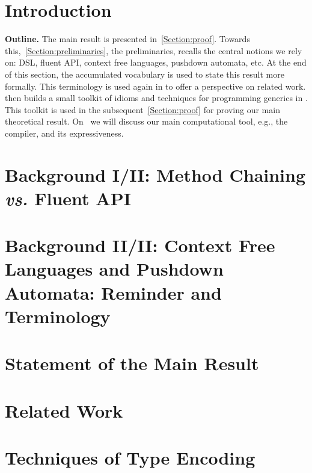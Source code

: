 \documentclass[a4paper,USenglish]{lipics}
\author{Anonymized for the submission}
\begin{document}
\maketitle
\begin{abstract}
  
\end{abstract}

\section{Introduction}


\textbf{Outline.}
The main result is presented in~\cref{Section:proof}.
Towards this,~\cref{Section:preliminaries}, the preliminaries, 
  recalls the central notions we rely on: DSL, fluent API,
  context free languages, pushdown automata, etc. 
At the end of this section, the accumulated vocabulary is used to state this
  result more formally.
This terminology is used again in  to offer 
  a perspective on related work.
 then builds a small toolkit of idioms and techniques
  for programming generics in \Java.
This toolkit is used in the subsequent~\cref{Section:proof} for
  proving our main theoretical result.
On~ we will discuss our main computational tool, 
  e.g., the \Java compiler, and its expressiveness.

\section{Background I/II: Method Chaining \emph{vs.} Fluent API}
\label{Section:fluent}


\section{Background II/II: Context Free Languages and Pushdown Automata: Reminder and Terminology}
\label{Section:pushdown}


\section{Statement of the Main Result}
\label{Section:result}


\section{Related Work}
\label{Section:related}


\section{Techniques of Type Encoding}
\label{Section:toolkit}

\end{document}
